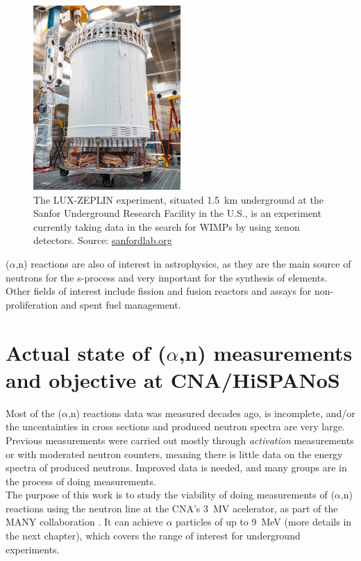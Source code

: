 \documentclass[a4paper,12pt]{report}
\newcommand{\an}{($\alpha$,n) }
\begin{document}
\begin{figure}[H]
	\centering
	\includegraphics[width=0.5\textwidth]{sanford.jpg}
	\caption{The LUX-ZEPLIN experiment, situated \qty{1.5}{\kilo\meter} underground at the Sanfor Underground Research Facility in the U.S., is an experiment currently taking data in the search for WIMPs by using xenon detectors.
	Source: \href{https://sanfordlab.org/experiment/lux-zeplin}{sanfordlab.org}}
	\label{sanford}
\end{figure}

\an reactions are also of interest in astrophysics, as they are the main source of neutrons for the s-process and very important for the synthesis of elements.\cite{astro1}\cite{astro2}
Other fields of interest include fission and fusion reactors and assays for non-proliferation and spent fuel management.\cite{INDC}

\section{Actual state of \an measurements and objective at CNA/HiSPANoS}
Most of the \an reactions data was measured decades ago, is incomplete, and/or the uncentainties in cross sections and produced neutron spectra are very large.
Previous measurements were carried out mostly through \textit{activation} measurements or with moderated neutron counters, meaning there is little data on the energy spectra of produced neutrons.
Improved data is needed, and many groups are in the process of doing measurements.\cite{INDC}
\\

The purpose of this work is to study the viability of doing measurements of \an reactions using the neutron line at the CNA's \qty{3}{\mega\volt} acelerator, as part of the MANY collaboration \cite{MANY}.
It can achieve $\alpha$ particles of up to \qty{9}{\mega\eV} (more details in the next chapter), which covers the range of interest for underground experiments.\cite{CNA}
\end{document}
